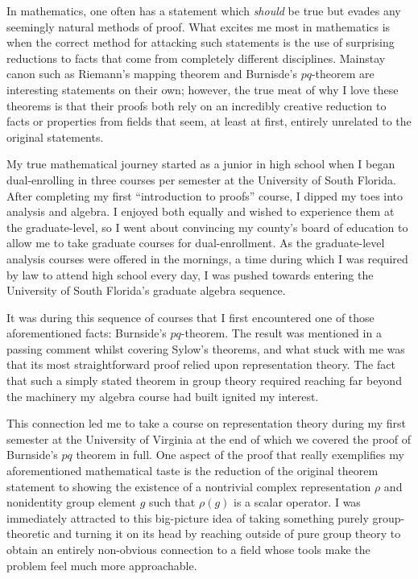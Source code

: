 \documentclass[11pt]{article}
\begin{document}

In mathematics, one often has a statement which \emph{should} be true but evades any seemingly natural methods of proof. What excites me most in mathematics is when the correct method for attacking such statements is the use of surprising reductions to facts that come from completely different disciplines. Mainstay canon such as Riemann's mapping theorem and Burnisde's $pq$-theorem are interesting statements on their own; however, the true meat of why I love these theorems is that their proofs both rely on an incredibly creative reduction to facts or properties from fields that seem, at least at first, entirely unrelated to the original statements.

My true mathematical journey started as a junior in high school when I began dual-enrolling in three courses per semester at the University of South Florida. After completing my first ``introduction to proofs'' course, I dipped my toes into analysis and algebra. I enjoyed both equally and wished to experience them at the graduate-level, so I went about convincing my county's board of education to allow me to take graduate courses for dual-enrollment. As the graduate-level analysis courses were offered in the mornings, a time during which I was required by law to attend high school every day, I was pushed towards entering the University of South Florida's graduate algebra sequence.

It was during this sequence of courses that I first encountered one of those aforementioned facts: Burnside's $pq$-theorem. The result was mentioned in a passing comment whilst covering Sylow's theorems, and what stuck with me was that its most straightforward proof relied upon representation theory. The fact that such a simply stated theorem in group theory required reaching far beyond the machinery my algebra course had built ignited my interest.

This connection led me to take a course on representation theory during my first semester at the University of Virginia at the end of which we covered the proof of Burnside's $pq$ theorem in full. One aspect of the proof that really exemplifies my aforementioned mathematical taste is the reduction of the original theorem statement to showing the existence of a nontrivial complex representation $\rho$ and nonidentity group element $g$ such that $\rho(g)$ is a scalar operator. I was immediately attracted to this big-picture idea of taking something purely group-theoretic and turning it on its head by reaching outside of pure group theory to obtain an entirely non-obvious connection to a field whose tools make the problem feel much more approachable.
\end{document}

